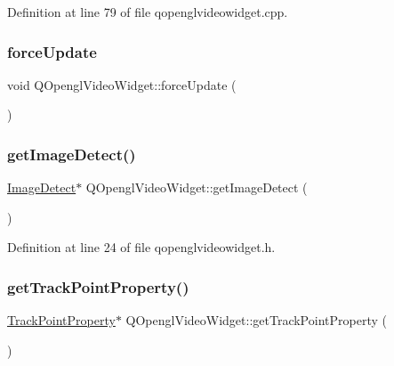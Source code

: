Definition at line 79 of file qopenglvideowidget.\+cpp.

\mbox{\label{class_q_opengl_video_widget_a597448d1dd651ceb1d7b1d0e3c21c273}} 
\subsubsection{\texorpdfstring{forceUpdate}{forceUpdate}}
{\footnotesize\ttfamily void Q\+Opengl\+Video\+Widget\+::force\+Update (\begin{DoxyParamCaption}{ }\end{DoxyParamCaption})\hspace{0.3cm}{\ttfamily [signal]}}

\mbox{\label{class_q_opengl_video_widget_ab256cefe1bb2e4790f1c7d4c1989b12e}} 
\subsubsection{\texorpdfstring{getImageDetect()}{getImageDetect()}}
{\footnotesize\ttfamily \mbox{\hyperlink{class_image_detect}{Image\+Detect}}$\ast$ Q\+Opengl\+Video\+Widget\+::get\+Image\+Detect (\begin{DoxyParamCaption}{ }\end{DoxyParamCaption})\hspace{0.3cm}{\ttfamily [inline]}}



Definition at line 24 of file qopenglvideowidget.\+h.

\mbox{\label{class_q_opengl_video_widget_ae028c3ff76eb983d0222ec2c0a6b4cfb}} 
\subsubsection{\texorpdfstring{getTrackPointProperty()}{getTrackPointProperty()}}
{\footnotesize\ttfamily \mbox{\hyperlink{struct_track_point_property}{Track\+Point\+Property}}$\ast$ Q\+Opengl\+Video\+Widget\+::get\+Track\+Point\+Property (\begin{DoxyParamCaption}{ }\end{DoxyParamCaption})\hspace{0.3cm}{\ttfamily [inline]}}



